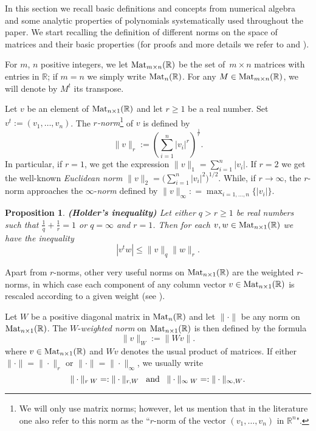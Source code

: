 \documentclass[10pt]{article}
\newcommand\reals{{\mathbb R}}
\newcommand\R{{\mathbb R}}
\newtheorem{prop}[theorem]{Proposition}
\newtheorem{definition}[theorem]{Definition}
\newenvironment{definition*}{\begin{definition}\em}{\end{definition}}
\begin{document}
In this section  we recall basic  definitions and concepts from numerical algebra and some analytic properties of polynomials systematically 
used throughout  the paper.
 We start  recalling the 
definition of different norms  on the space of matrices  and their  basic properties (for proofs and more details we refer  to \cite{Matrix}  and  \cite{TB97}).


For  $m$, $n$  positive integers, we  let ${\rm Mat}_{m \times n}(\R)$
be the set of~$m \times n$ matrices with entries in $\R$; 
if $m=n$ we simply write ${\rm Mat}_{n}(\R)$.
For any  $M \in {\rm Mat}_{m \times n}(\R)$, we will denote by $M^t$ its transpose.

\begin{definition*}\label{defnorms}
Let $v$ be  an  element of   $ {\rm Mat}_{n \times 1}(\R)$
and let $r \ge 1$ be a real number. Set $v^t:=(v_1,\ldots,v_n)$.
The {\em $r$-norm}\footnote{We will only use matrix norms; however, let us mention that in the literature one also refer to  this norm as the ``$r$-norm of the vector $(v_1,\ldots,v_n)$ in $\reals^n$".} of $v$ is defined 
by  $$\|v\|_r := \left( \sum_{i=1}^n |v_i|^r \right)^{\frac{1}{r}}.$$ In particular,
 if $r=1$, we get the expression
$
\|v\|_1 = \sum_{i=1}^n |v_i|.
$
 If $r=2$ we get the well-known {\em Euclidean norm}
$
\|v\|_2 = \big({\sum_{i=1}^n |v_i|^2}\big)^{1/2}.
$ 
While, if $r \rightarrow \infty$, the $r$-norm approaches 
the $ \infty$-{\em norm} defined by 
$
\|v\|_\infty: = \max_{i=1, \ldots, n} \big\{|v_i|\big\}.
$
\end{definition*}


\begin{prop}{\bf (Holder's inequality)} \label{propHolder}
Let  either $ q>r \ge 1$ be     real numbers such that 
$\frac{1}{q} + \frac{1}{r}=1$ or $q=\infty$ and $r=1$. 
Then for each $v, w \in  {\rm Mat}_{n \times 1}(\R)$ we have the inequality
$$
|v^t w| \le \|v\|_q \|w\|_r.
$$
\end{prop}


Apart from $r$-norms, other very useful norms 
on $ {\rm Mat}_{n \times 1}(\R)$
are  the weighted $r$-norms, in which case each component of any column vector 
$v \in  {\rm Mat}_{n \times 1}(\R)$ is rescaled according to a given weight  (see \cite{TB97}). 

\begin{definition*}\label{weightedNorm}
Let $W$ be a positive diagonal matrix in ${\rm Mat}_n(\R)$
and let $\|\cdot\|$ be any norm on $ {\rm Mat}_{n \times 1}(\R)$.
The $W$-{\em weighted norm} on  ${\rm Mat}_{n \times 1}(\R)$  is then defined  
by the formula
$$
\|v\|_W := \|Wv\|.
$$
where $v\in  {\rm Mat}_{n \times 1}(\R)$  and $W v$ denotes the usual  product of matrices. 
If either $\|\cdot\|=\|\cdot\|_r$ or $\|\cdot\|=\|\cdot\|_\infty$, we usually write
$$\|\cdot\|_{r\;  W}=:\|\cdot\|_{r,W}\;\; \;{\rm  and} \;\;\;  \|\cdot\|_{\infty \; W}=:\|\cdot\|_{\infty,W}.$$
\end{definition*}
\smallskip
\end{document}
